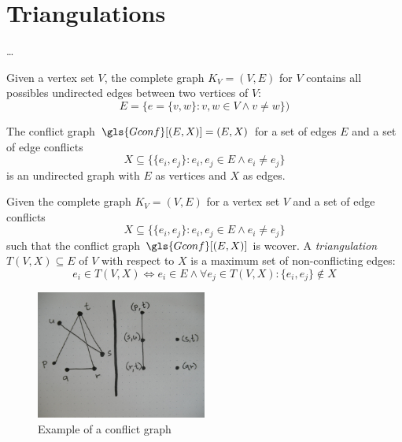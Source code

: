 \chapter{Triangulations}\label{cha:triangulations}
\ldots{}


\begin{definition}
  Given a vertex set \(V\), the complete graph \(K_V=(V,E)\) for \(V\)
  contains all possibles undirected edges between two vertices of
  \(V\):
  \[ E = \{e=\{v,w\} : v,w \in V \land v\not=w\}) \]
\end{definition}


\begin{definition}
  \label{def:conflict_graph}
  The conflict graph \(\gls{Gconf}[(E,X)] = (E,X)\) for a set of
  edges \(E\) and a set of edge conflicts
  \[
    X \subseteq
    \{\{e_i, e_j\} : e_i,e_j \in E \land e_i \not= e_j\}
  \]
  is an undirected graph with \(E\) as vertices and \(X\) as edges.
\end{definition}


\begin{definition}[Triangulation]
  Given the complete graph \(K_V = (V,E)\) for a vertex set \(V\)
  and a set of edge conflicts
  \[
    X \subseteq
    \{\{e_i, e_j\} : e_i,e_j \in E \land e_i \not= e_j\}
  \]
  such that the conflict graph \(\gls{Gconf}[(E,X)]\) is \gls{wcover}.
  A \emph{triangulation} \(T(V,X) \subseteq E\) of \(V\) with respect
  to \(X\) is a maximum set of non-conflicting edges:
  \[
    e_i \in T(V,X)
    \iff e_i \in E
    \land \forall e_j \in T(V,X) : \{e_i,e_j\} \not\in X
  \]
\end{definition}


\begin{figure}[ht]
  \centering
  \includegraphics[width=0.5\textwidth]{img/example_conflict_graph.jpg}
  \caption{Example of a conflict graph}
\end{figure}

